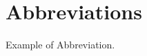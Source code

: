 \chapter*{Abbreviations}
\label{sec:acronimos}


\begin {description}[leftmargin=8em,style=nextline]
\item[EOA]Example of Abbreviation.





\end {description}

